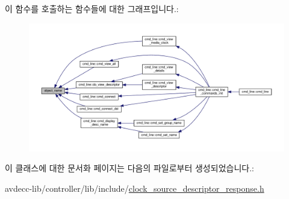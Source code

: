 이 함수를 호출하는 함수들에 대한 그래프입니다.\+:
\nopagebreak
\begin{figure}[H]
\begin{center}
\leavevmode
\includegraphics[width=350pt]{classavdecc__lib_1_1descriptor__response__base_a133f7774946d80f82b8aaaa4cfbb7361_icgraph}
\end{center}
\end{figure}




이 클래스에 대한 문서화 페이지는 다음의 파일로부터 생성되었습니다.\+:\begin{DoxyCompactItemize}
\item 
avdecc-\/lib/controller/lib/include/\hyperlink{clock__source__descriptor__response_8h}{clock\+\_\+source\+\_\+descriptor\+\_\+response.\+h}\end{DoxyCompactItemize}
